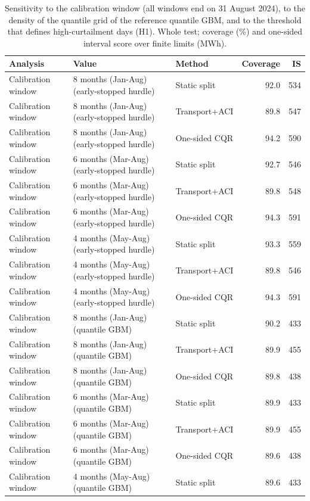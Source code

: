 \begin{table}[tp]
\centering
\footnotesize
\caption{Sensitivity to the calibration window (all windows end on 31 August 2024), to the density of the quantile grid of the reference quantile GBM, and to the threshold that defines high-curtailment days (H1). Whole test; coverage (\%) and one-sided interval score over finite limits (MWh).}
\label{tab:sens_cal}
\begin{tabular}{l l l rr}
\toprule
Analysis & Value & Method & Coverage & IS \\
\midrule
Calibration window & 8 months (Jan-Aug) (early-stopped hurdle) & Static split & 92.0 & 534 \\
Calibration window & 8 months (Jan-Aug) (early-stopped hurdle) & Transport+ACI & 89.8 & 547 \\
Calibration window & 8 months (Jan-Aug) (early-stopped hurdle) & One-sided CQR & 94.2 & 590 \\
Calibration window & 6 months (Mar-Aug) (early-stopped hurdle) & Static split & 92.7 & 546 \\
Calibration window & 6 months (Mar-Aug) (early-stopped hurdle) & Transport+ACI & 89.8 & 548 \\
Calibration window & 6 months (Mar-Aug) (early-stopped hurdle) & One-sided CQR & 94.3 & 591 \\
Calibration window & 4 months (May-Aug) (early-stopped hurdle) & Static split & 93.3 & 559 \\
Calibration window & 4 months (May-Aug) (early-stopped hurdle) & Transport+ACI & 89.8 & 546 \\
Calibration window & 4 months (May-Aug) (early-stopped hurdle) & One-sided CQR & 94.3 & 591 \\
Calibration window & 8 months (Jan-Aug) (quantile GBM) & Static split & 90.2 & 433 \\
Calibration window & 8 months (Jan-Aug) (quantile GBM) & Transport+ACI & 89.9 & 455 \\
Calibration window & 8 months (Jan-Aug) (quantile GBM) & One-sided CQR & 89.8 & 438 \\
Calibration window & 6 months (Mar-Aug) (quantile GBM) & Static split & 89.9 & 433 \\
Calibration window & 6 months (Mar-Aug) (quantile GBM) & Transport+ACI & 89.9 & 455 \\
Calibration window & 6 months (Mar-Aug) (quantile GBM) & One-sided CQR & 89.6 & 438 \\
Calibration window & 4 months (May-Aug) (quantile GBM) & Static split & 89.6 & 433 \\

\end{tabular}
\end{table}
